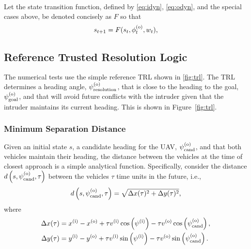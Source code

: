 Let the state transition function, defined by \eqref{eq:idyn}, \eqref{eq:odyn}, and the special cases above, be denoted concisely as $F$ so that  
\begin{equation}\label{eq:sys_dyn}
    s_{t+1} = F(s_t, \phi^{(\mathrm{o})}_t, w_t) \text{,}
\end{equation}


\subsection{Reference Trusted Resolution Logic}\label{sec:trl}

The numerical tests use the simple reference TRL shown in \cref{fig:trl}.
The TRL determines a heading angle, $\psi^{(\mathrm{o})}_\mathrm{resolution}$, that is close to the heading to the goal, $\psi^{(\mathrm{o})}_\mathrm{goal}$, and that will avoid future conflicts with the intruder given that the intruder maintains its current heading. This is shown in Figure~\ref{fig:trl}.

\subsubsection{Minimum Separation Distance}

Given an initial state $s$, a candidate heading for the UAV, $\psi^{(\mathrm{o})}_{\mathrm{cand}}$, and that both vehicles maintain their heading, the distance between the vehicles at the time of closest approach is a simple analytical function. Specifically, consider the distance  $d\left(s,\psi^{(\mathrm{o})}_{\mathrm{cand}},\tau\right)$ between the vehicles $\tau$ time units in the future, i.e., 
\begin{equation} \label{eqn:dist}
    d\left(s, \psi^{(\mathrm{o})}_{\mathrm{cand}}, \tau\right) = \sqrt{\Delta x(\tau)^2 + \Delta y(\tau)^2} \text{,}
\end{equation}
where
\begin{align*}
    \Delta x(\tau) &= x^{(\mathrm{i})} - x^{(\mathrm{o})} + \tau v^{(\mathrm{i})} \cos\left(\psi^{(\mathrm{i})}\right) - \tau v^{(\mathrm{o})} \cos\left(\psi^{(\mathrm{o})}_{\mathrm{cand}}\right),\\
    \Delta y(\tau) &= y^{(\mathrm{i})} - y^{(\mathrm{o})} + \tau v^{(\mathrm{i})} \sin\left(\psi^{(\mathrm{i})}\right) - \tau v^{(\mathrm{o})} \sin\left(\psi^{(\mathrm{o})}_{\mathrm{cand}}\right) \text{.}
\end{align*}

